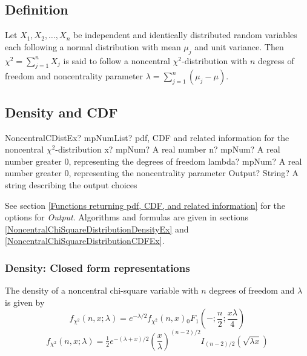 \subsection{Definition}

\label{NoncentralChiSquareDistributionDefinitionEx}

Let $X_1, X_2, \ldots, X_n$ be independent and identically distributed random variables each following a normal distribution with mean $\mu_j$ and unit variance. 
Then $\chi^2 = \sum_{j=1}^n X_j$ is said to follow a noncentral $\chi^2$-distribution with $n$ degress of freedom and noncentrality parameter \mbox{$\lambda = \sum_{j=1}^n (\mu_j - \mu)$.} 




\subsection{Density and CDF}

\begin{mpFunctionsExtract}
	\mpFunctionFourNotImplemented
	{NoncentralCDistEx? mpNumList? pdf, CDF and related information for the noncentral $\chi^2$-distribution}
	{x? mpNum? A real number}
	{n? mpNum? A real number greater 0, representing the degrees of freedom}
	{lambda? mpNum? A real number greater 0, representing the noncentrality parameter}
	{Output? String? A string describing the output choices}
\end{mpFunctionsExtract}


\vspace{0.3cm}
See section \ref{Functions returning pdf, CDF, and related information} for the options for {\itshape\sffamily Output}. Algorithms and formulas are given in sections \ref{NoncentralChiSquareDistributionDensityEx} and \ref{NoncentralChiSquareDistributionCDFEx}.




\label{NoncentralChiSquareDistributionDensityEx}

\subsubsection{Density: Closed form representations}
The density of a noncentral chi-square variable with $n$ degrees of freedom  and $\lambda$ is given by  \citep{Wang1993}
\begin{equation}
	f_{\chi^2}\left(n, x; \lambda\right) =  e^{-\lambda/2} f_{\chi^2}(n, x)  {}_0F_1 \left(-; \frac{n}{2}; \frac{x \lambda}{4}\right)
\end{equation}
\begin{equation}
	f_{\chi^2}\left(n, x; \lambda\right) = \tfrac{1}{2} e^{-(\lambda+x)/2} \left( \frac{x}{\lambda}\right)^{(n-2)/2}  I_{(n-2)/2}\left(\sqrt{\lambda x}\right)
\end{equation}


